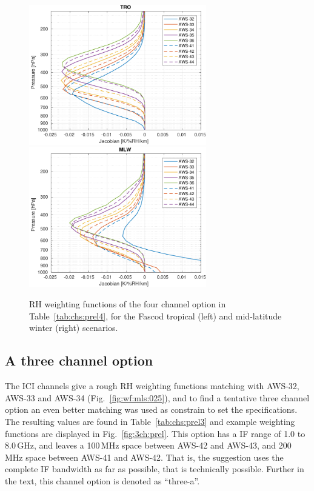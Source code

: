\documentclass[12pt]{article}
\begin{document}
\begin{figure}[!p]
  \centering
  \includegraphics[height=61mm]{fascod_4chopt_tro}\hspace{5mm}%
  \includegraphics[clip,trim=43 0 0 0,height=61mm]{fascod_4chopt_mlw}
  \caption{RH weighting functions of the four channel option in
    Table~\ref{tab:chs:prel4}, for the Fascod tropical (left) and mid-latitude
    winter (right) scenarios.}
  \label{fig:4ch:prel}
\end{figure}


\subsection{A three channel option}
%
The ICI channels give a rough RH weighting functions matching with AWS-32,
AWS-33 and AWS-34 (Fig.~\ref{fig:wf:mls:025}), and to find a tentative three
channel option an even better matching was used as constrain to set the
specifications. The resulting values are found in Table~\ref{tab:chs:prel3} and
example weighting functions are displayed in Fig.~\ref {fig:3ch:prel}. This
option has a IF range of 1.0 to 8.0\,GHz, and leaves a 100\,MHz space between
AWS-42 and AWS-43, and 200\,MHz space between AWS-41 and AWS-42. That is, the
suggestion uses the complete IF bandwidth as far as possible, that is
technically possible. Further in the text, this channel option is denoted as ``three-a''. 
\end{document}
